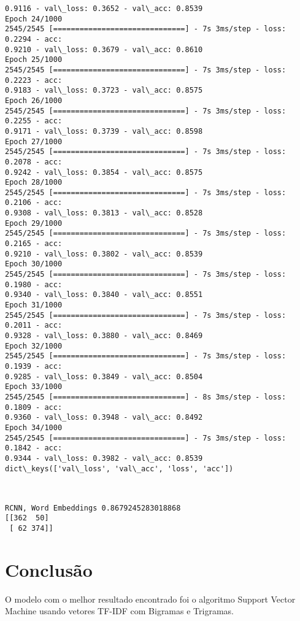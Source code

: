 \documentclass[11pt]{article}
\begin{document}
\begin{Verbatim}[commandchars=\\\{\}]
0.9116 - val\_loss: 0.3652 - val\_acc: 0.8539
Epoch 24/1000
2545/2545 [==============================] - 7s 3ms/step - loss: 0.2294 - acc:
0.9210 - val\_loss: 0.3679 - val\_acc: 0.8610
Epoch 25/1000
2545/2545 [==============================] - 7s 3ms/step - loss: 0.2223 - acc:
0.9183 - val\_loss: 0.3723 - val\_acc: 0.8575
Epoch 26/1000
2545/2545 [==============================] - 7s 3ms/step - loss: 0.2255 - acc:
0.9171 - val\_loss: 0.3739 - val\_acc: 0.8598
Epoch 27/1000
2545/2545 [==============================] - 7s 3ms/step - loss: 0.2078 - acc:
0.9242 - val\_loss: 0.3854 - val\_acc: 0.8575
Epoch 28/1000
2545/2545 [==============================] - 7s 3ms/step - loss: 0.2106 - acc:
0.9308 - val\_loss: 0.3813 - val\_acc: 0.8528
Epoch 29/1000
2545/2545 [==============================] - 7s 3ms/step - loss: 0.2165 - acc:
0.9210 - val\_loss: 0.3802 - val\_acc: 0.8539
Epoch 30/1000
2545/2545 [==============================] - 7s 3ms/step - loss: 0.1980 - acc:
0.9340 - val\_loss: 0.3840 - val\_acc: 0.8551
Epoch 31/1000
2545/2545 [==============================] - 7s 3ms/step - loss: 0.2011 - acc:
0.9328 - val\_loss: 0.3880 - val\_acc: 0.8469
Epoch 32/1000
2545/2545 [==============================] - 7s 3ms/step - loss: 0.1939 - acc:
0.9285 - val\_loss: 0.3849 - val\_acc: 0.8504
Epoch 33/1000
2545/2545 [==============================] - 8s 3ms/step - loss: 0.1809 - acc:
0.9360 - val\_loss: 0.3948 - val\_acc: 0.8492
Epoch 34/1000
2545/2545 [==============================] - 7s 3ms/step - loss: 0.1842 - acc:
0.9344 - val\_loss: 0.3982 - val\_acc: 0.8539
dict\_keys(['val\_loss', 'val\_acc', 'loss', 'acc'])
\end{Verbatim}

    \begin{center}
    \end{center}
    { \hspace*{\fill} \\}
    
    \begin{Verbatim}[commandchars=\\\{\}]
RCNN, Word Embeddings 0.8679245283018868
[[362  50]
 [ 62 374]]
\end{Verbatim}

    \hypertarget{conclusuxe3o}{%
\section{Conclusão}\label{conclusuxe3o}}

    O modelo com o melhor resultado encontrado foi o algoritmo Support
Vector Machine usando vetores TF-IDF com Bigramas e Trigramas.


    
    
    
    
\end{document}
